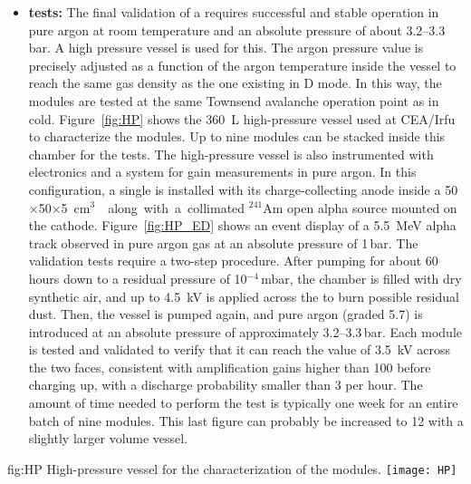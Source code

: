 \begin{itemize}
\item {\bf {} tests:} The final validation of a  requires successful and stable operation in pure argon at room temperature and an absolute pressure of about \numrange{3.2}{3.3}\,bar. A high pressure vessel is used for this.  The argon pressure value is precisely adjusted as a function of the argon temperature inside the vessel to reach the same gas density as the one existing in D mode. In this way, the  modules are tested at the same Townsend avalanche operation point as in cold. Figure~\ref{fig:HP} shows the \SI{360}{L} high-pressure vessel used at CEA/Irfu to characterize the    modules. Up to nine  modules can be stacked inside this chamber for the  tests. The high-pressure vessel is also instrumented with  electronics and a  system for gain measurements in pure argon. In this configuration, a single  is installed with its \twod charge-collecting anode inside 
a \num{50}$\times$\num{50}$\times$\SI{5}{cm$^3$} 
 along with a collimated $^{241}$Am open alpha source mounted on 
the cathode. Figure~\ref{fig:HP_ED} shows an event display of a \SI{5.5}{MeV} alpha track observed in pure argon gas at an 
absolute pressure of \num{1}\,bar.
%
The  validation  tests require a two-step procedure. After pumping for 
about \num{60} hours down to a residual pressure of \num{10}$^{-4}$\,mbar, the chamber is filled with dry synthetic air, and 
  up to \SI{4.5}{kV} is applied across the  to 
burn possible residual dust. Then, the vessel is pumped again, and pure argon (graded \num{5.7})
is introduced at an absolute pressure of approximately \numrange{3.2}{3.3}\,bar. Each  module is tested 
and validated to verify that it can reach the value of \SI{3.5}{kV} across the two faces, consistent with amplification gains higher than \num{100} before charging up, with a discharge probability smaller than 3 per hour. The amount of time needed to perform the   test is 
typically one week for an entire batch of nine  modules. This last figure can probably be increased to \num{12} with a slightly larger volume vessel. 
\end{itemize}

\begin{dunefigure}
{fig:HP} 
{High-pressure vessel for the characterization of the    modules.}
  \texttt{[image: HP]}
\end{dunefigure}

